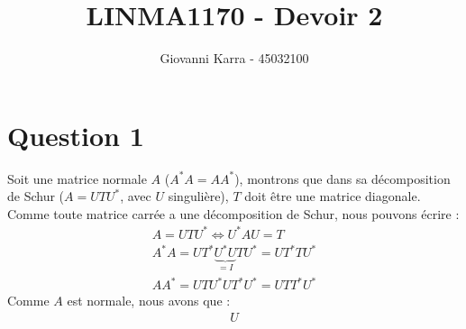 \documentclass[11pt]{article}
\title{LINMA1170 - Devoir 2}
\author{Giovanni Karra - 45032100}
\begin{document}
\maketitle

\section*{Question 1}
Soit une matrice normale $A$ ($A^*A = AA^*$), montrons que dans sa décomposition de Schur ($A = UTU^*$, avec $U$ singulière), $T$ doit être une matrice diagonale. Comme toute matrice carrée a une décomposition de Schur, nous pouvons écrire :
\begin{align}
	A = UTU^* \Leftrightarrow U^*AU = T\\
	A^*A = UT^*\underbrace{U^*U}_{=I}TU^* = UT^*TU^*\\
	AA^* = UTU^*UT^*U^* = UTT^*U^*
\end{align}
Comme $A$ est normale, nous avons que :
\begin{align*}
	U
\end{align*}
\end{document}

